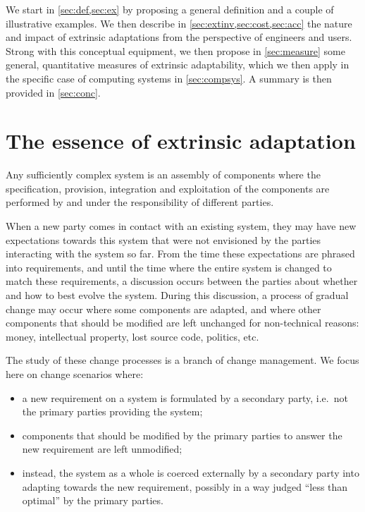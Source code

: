 \documentclass[a4paper]{article}
\newcommand{\ie}{i.e.~}
\begin{document}
We start in \cref{sec:def,sec:ex} by proposing a general definition
and a couple of illustrative examples. We then describe in
\cref{sec:extinv,sec:cost,sec:acc} the nature and impact of extrinsic
adaptations from the perspective of engineers and users. Strong with
this conceptual equipment, we then propose in \cref{sec:measure} some
general, quantitative measures of extrinsic adaptability, which we
then apply in the specific case of computing systems in
\cref{sec:compsys}. A summary is then provided in \cref{sec:conc}.

\section{The essence of extrinsic adaptation}\label{sec:def}

Any sufficiently complex system is an assembly of components where the
specification, provision, integration and exploitation of the
components are performed by and under the responsibility of different
parties.

When a new party comes in contact with an existing
system, they may have new expectations towards this system that were
not envisioned by the parties interacting with the system so far. From
the time these expectations are phrased into requirements, and until
the time where the entire system is changed to match these
requirements, a discussion occurs between the parties about whether
and how to best evolve the system. During this discussion, a process
of gradual change may occur where some components are adapted, and
where other components that should be modified are left unchanged for
non-technical reasons: money, intellectual property, lost source code,
politics, etc.

The study of these change processes is a branch of change management.  We
focus here on change scenarios where:
\begin{itemize}
\item a new requirement on a system is formulated by a secondary
  party, \ie not the primary parties providing the system;
\item components that should be modified by the primary parties to
  answer the new requirement are left unmodified;
\item instead, the system as a whole is coerced externally by a
  secondary party into adapting towards the new requirement, possibly
  in a way judged ``less than optimal'' by the primary parties.
\end{itemize}
\end{document}
